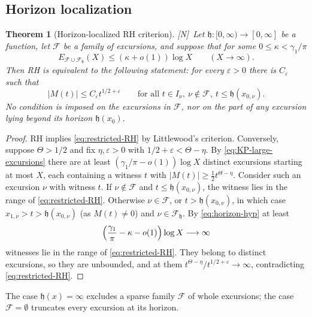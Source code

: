 \documentclass[11pt,reqno]{amsart}
\numberwithin{equation}{section}
\theoremstyle{plain}
\newtheorem{theorem}{Theorem}[section]
\theoremstyle{definition}
\theoremstyle{remark}
\newcommand{\eps}{\varepsilon}
\newcommand{\F}{\mathcal{F}}
\newcommand{\tagN}{\textup{[N]}}
\begin{document}
\subsection{Horizon localization}
\label{subsec:horizon}

\begin{theorem}[Horizon-localized RH criterion]
\label{thm:horizon}
\tagN\ Let $\mathfrak h:[0,\infty)\to[0,\infty]$ be a function, let $\F$ be a family
of excursions, and suppose that for some $0\le\kappa<\gamma_1/\pi$
\begin{equation}
\label{eq:horizon-hyp}
E_{\F\cup\F_{\mathfrak h}}(X)\le(\kappa+o(1))\log X\qquad(X\to\infty).
\end{equation}
Then RH is equivalent to the following statement: for every $\eps>0$ there
is $C_\eps$ such that
\begin{equation}
\label{eq:restricted-RH}
|M(t)|\le C_\eps t^{1/2+\eps}
\qquad\text{for all }t\in I_\nu,\ \nu\notin\F,\ t\le \mathfrak h(x_{0,\nu}).
\end{equation}
No condition is imposed on the excursions in $\F$, nor on the part of any
excursion lying beyond its horizon $\mathfrak h(x_0)$.
\end{theorem}

\begin{proof}
RH implies \eqref{eq:restricted-RH} by Littlewood's criterion. Conversely,
suppose $\Theta>1/2$ and fix $\eta,\eps>0$ with
$1/2+\eps<\Theta-\eta$. By \eqref{eq:KP-large-excursions} there are at least
$(\gamma_1/\pi-o(1))\log X$ distinct excursions starting at most $X$, each
containing a witness $t$ with $|M(t)|\ge\frac12t^{\Theta-\eta}$. Consider
such an excursion $\nu$ with witness $t$. If $\nu\notin\F$ and
$t\le \mathfrak h(x_{0,\nu})$, the witness lies in the range of
\eqref{eq:restricted-RH}. Otherwise $\nu\in\F$, or $t>\mathfrak h(x_{0,\nu})$, in
which case $x_{1,\nu}>t>\mathfrak h(x_{0,\nu})$ (as $M(t)\ne0$) and $\nu\in\F_{\mathfrak h}$. By
\eqref{eq:horizon-hyp} at least
\begin{equation}
\Bigl(\frac{\gamma_1}{\pi}-\kappa-o(1)\Bigr)\log X\longrightarrow\infty
\end{equation}
witnesses lie in the range of \eqref{eq:restricted-RH}. They belong to
distinct excursions, so they are unbounded, and at them
$t^{\Theta-\eta}/t^{1/2+\eps}\to\infty$, contradicting
\eqref{eq:restricted-RH}.
\end{proof}

The case $\mathfrak h(x)=\infty$ excludes a sparse family $\F$ of whole excursions;
the case $\F=\emptyset$ truncates every excursion at its horizon.
\end{document}
